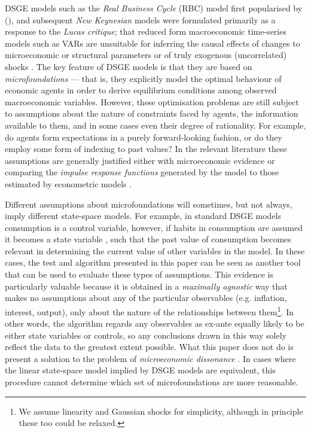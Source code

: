 \documentclass{article}
\begin{document}
DSGE models such as the \textit{Real Business Cycle} (RBC) model first popularised by \citeauthor{kydland1982time} (\citeyear{kydland1982time}), and subsequent \textit{New Keynesian} models were formulated primarily as a response to the \textit{Lucas critique}; that reduced form macroeconomic time-series models such as VARs are unsuitable for inferring the causal effects of changes to microeconomic or structural parameters or of truly exogenous (uncorrelated) shocks \parencite{lucas1976econometric}. The key feature of DSGE models is that they are based on \textit{microfoundations} --- that is, they explicitly model the optimal behaviour of economic agents in order to derive equilibrium conditions among observed macroeconomic variables. However, these optimisation problems are still subject to assumptions about the nature of constraints faced by agents, the information available to them, and in some cases even their degree of rationality. For example, do agents form expectations in a purely forward-looking fashion, or do they employ some form of indexing to past values? In the relevant literature these assumptions are generally justified either with microeconomic evidence or comparing the \textit{impulse response functions} generated by the model to those estimated by econometric models \parencite{christiano2018on}. 

Different assumptions about microfoundations will sometimes, but not always, imply different state-space models. For example, in standard DSGE models consumption is a control variable, however, if habits in consumption are assumed it becomes a state variable \parencite{fuhrer2000habit}, such that the past value of consumption becomes relevant in determining the current value of other variables in the model. In these cases, the test and algorithm presented in this paper can be seen as another tool that can be used to evaluate these types of assumptions. This evidence is particularly valuable because it is obtained in a \textit{maximally agnostic} way that makes no assumptions about any of the particular observables (e.g. inflation, interest, output), only about the nature of the relationships between them\footnote{We assume linearity and Gaussian shocks for simplicity, although in principle these too could be relaxed.}. In other words, the algorithm regards any observables as ex-ante equally likely to be either state variables or controls, so any conclusions drawn in this way solely reflect the data to the greatest extent possible. What this paper does not do is present a solution to the problem of \textit{microeconomic dissonance} \parencite{levin2008macroeconometric}. In cases where the linear state-space model implied by DSGE models are equivalent, this procedure cannot determine which set of microfoundations are more reasonable.
\end{document}
